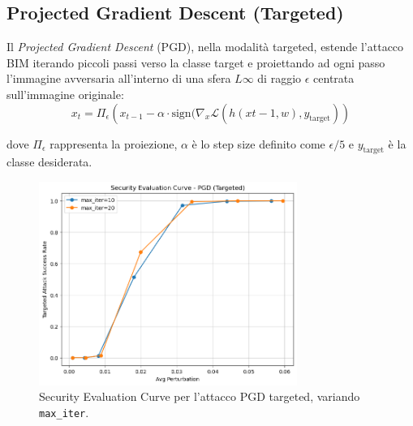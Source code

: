         \subsection{Projected Gradient Descent (Targeted)}
            Il \textit{Projected Gradient Descent} (PGD), nella modalità targeted, estende l’attacco BIM iterando piccoli passi verso la classe target e proiettando ad ogni passo l’immagine avversaria all’interno di una sfera $L\infty$ di raggio $\epsilon$ centrata sull’immagine originale:
            \[
            x_t = \Pi_\epsilon \left( x_{t-1} - \alpha \cdot \text{sign}( \nabla_x \mathcal{L}(h(x{t-1}, w), y_{\text{target}}) \right)
            \]
            
            \noindent dove $\Pi_\epsilon$ rappresenta la proiezione, $\alpha$ è lo step size definito come $\epsilon/5$ e $y_{\text{target}}$ è la classe desiderata.
            
            \begin{figure}[H]
                \centering
                \includegraphics[width=0.75\textwidth]{images/evaluation_curve_pgd_targeted.png}
                \caption{Security Evaluation Curve per l’attacco PGD targeted, variando \texttt{max\_iter}.}
                \label{fig:pgd_targeted_curve}
            \end{figure}
            
